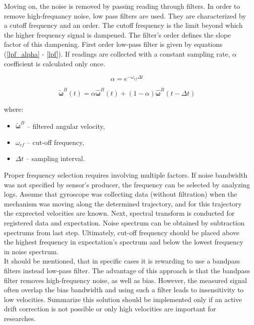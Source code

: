 Moving on, the noise is removed by passing reading through filters. In order to remove high-frequancy noise, low pass filters are used. They are characterized by a cutoff frequency and an order. The cutoff frequency is the limit beyond which the higher frequency signal is dampened. The filter's order defines the slope factor of this dampening. First order low-pass filter is given by equations (\ref{lpf_alpha} - \ref{lpf}). If readings are collected with a constant sampling rate, $\alpha$ coefficient is calculated only once.

\begin{equation}
	 \alpha = e^{ - \omega_{cf} \Delta t}
	\label{lpf_alpha}
\end{equation}

\begin{equation}
	\bm{\tilde{\omega}}^B(t) = \alpha  \bm{\hat{\omega}}^B(t) + \left( 1 - \alpha \right) \bm{\hat{\omega}}^B(t - \Delta t)
	\label{lpf}
\end{equation}

where:
\begin{itemize}
	\item $\bm{\tilde{\omega}}^B$ -- filtered angular velocity,
	\item $\omega_{cf}$ -- cut-off frequency,
	\item $\Delta t$ -- sampling interval.
\end{itemize}

Proper frequency selection requires involving multiple factors. If noise bandwidth was not specified by sensor's producer, the frequency can be selected by analyzing logs. Assume that gyroscope was collecting data (without filtration) when the mechanism was moving along the determined trajectory, and for this trajectory the exprected velocities are known. Next, spectral transform is conducted for registered data and expectation. Noise spectrum can be obtained by subtraction spectrums from last step. Ultimately, cut-off frequency should be placed above the highest frequency in expectation's spectrum and below the lowest frequency in noise spectrum.\\

It should be mentioned, that in specific cases it is rewarding to use a bandpass filters instead low-pass filter. The advantage of this approach is that the bandpass filter removes high-frequency noise, as well as bias. However, the measured signal often overlap the bias bandwidth and using such a filter leads to insensitivity to low velocities. Summarize this solution should be implemented only if an active drift correction is not possible or only high velocities are important for researches.


